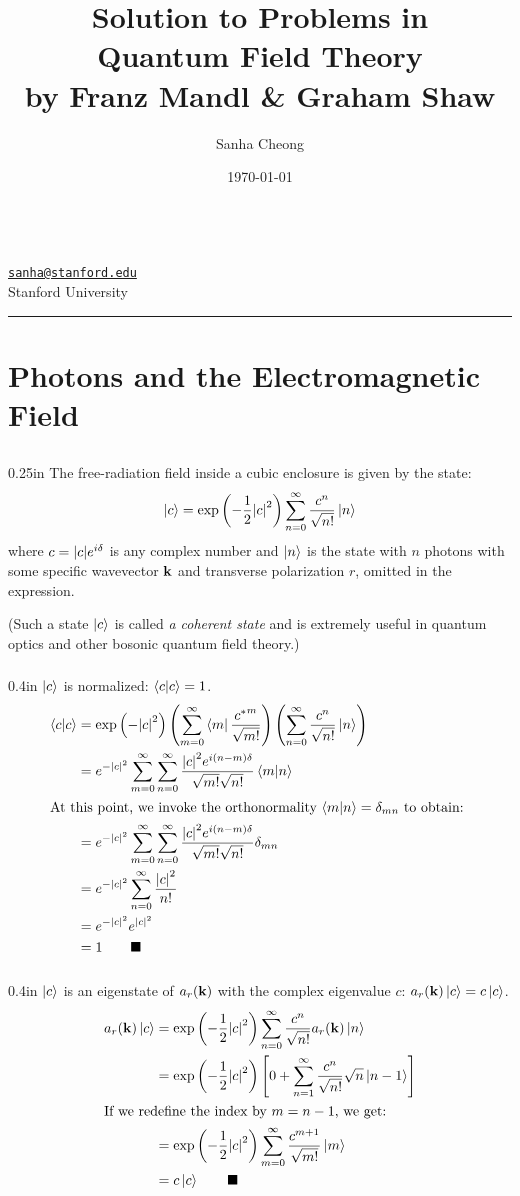 \documentclass[letterpaper,12pt]{article}
\title{
	\huge{Solution to Problems in\\Quantum Field Theory}\\
	\vspace{0.1in}
	\Large{by Franz Mandl \& Graham Shaw}
}
\author{Sanha Cheong}
\date{\today}
\makeatletter
\newcommand{\linia}{\rule{\linewidth}{0.5pt}}
\def\email{\texttt{\href{mailto:sanha@stanford.edu}{sanha@stanford.edu}}}
\def\institution{Stanford University}
\renewcommand{\maketitle}{
\begin{center}
\textsc{\@title}
\end{center}
\vspace{2ex}
\Large{\@author} \hfill \Large{\@date}		\\
\large{\email}	\hfill	$ $			\\
\large{\institution}
\\
\linia
}
\newenvironment{problem}{\subsection{}\begin{adjustwidth}{0.25in}{}\vspace{-\baselineskip}}{\end{adjustwidth}}
\newenvironment{subproblem}{\subsubsection{}\begin{adjustwidth}{0.4in}{}\vspace{-\baselineskip}}{\end{adjustwidth}}
\newcommand{\done}{\tag*{$\blacksquare$}}
\makeatother
\begin{document}
\maketitle

\section{Photons and the Electromagnetic Field}

\begin{problem}
The free-radiation field inside a cubic enclosure is given by the state:
\begin{equation*}
\ket{c} = \exp\left(-\frac{1}{2}\abs{c}^2\right)
\sum_{n=0}^{\infty} \frac{c^n}{\sqrt{n!}} \ket{n}
\end{equation*}
where $c=\abs{c}e^{i\delta}$ is any complex number and $\ket{n}$ is the state with $n$ photons with some specific wavevector $\vb{k}$ and transverse polarization $r$, omitted in the expression.

(Such a state $\ket{c}$ is called \emph{a coherent state} and is extremely useful in quantum optics and other bosonic quantum field theory.)

\begin{subproblem}
	$\ket{c}$ is normalized: $\braket{c}{c}=1$.
	\begin{align*}
		\braket{c}{c}
		&= \exp\left(-\abs{c}^2\right)
		\left(\sum_{m=0}^{\infty}\bra{m}\frac{{c^*}^m}{\sqrt{m!}}\right)
		\left(\sum_{n=0}^{\infty}\frac{c^n}{\sqrt{n!}}\ket{n}\right)	\\
		&= e^{-\abs{c}^2}
		\sum_{m=0}^{\infty}\sum_{n=0}^{\infty}
		\frac{\abs{c}^2 e^{i(n-m)\delta}}{\sqrt{m!}\sqrt{n!}}\braket{m}{n}	\\
	\intertext{At this point, we invoke the orthonormality $\braket{m}{n}=\delta_{mn}$ to obtain: }
		&= e^{-\abs{c}^2}
		\sum_{m=0}^{\infty}\sum_{n=0}^{\infty}
		\frac{\abs{c}^2 e^{i(n-m)\delta}}{\sqrt{m!}\sqrt{n!}} \delta_{mn}	\\
		&= e^{-\abs{c}^2} \sum_{n=0}^{\infty} \frac{\abs{c}^2}{n!}	\\
		&= e^{-\abs{c}^2} e^{\abs{c}^2}	\\
		&=1		\done
	\end{align*}
\end{subproblem}

\begin{subproblem}
	$\ket{c}$ is an eigenstate of $a_r(\vb{k})$ with the complex eigenvalue $c$: $a_r(\vb{k}) \ket{c} = c\ket{c}$.
	\begin{align*}
		a_r(\vb{k}) \ket{c} &=
		\exp\left(-\frac{1}{2}\abs{c}^2\right)
		\sum_{n=0}^{\infty} \frac{c^n}{\sqrt{n!}} a_r(\vb{k})\ket{n}	\\
		&= \exp\left(-\frac{1}{2}\abs{c}^2\right)
		\left[0 + \sum_{n=1}^{\infty} \frac{c^n}{\sqrt{n!}} \sqrt{n}\ket{n-1}\right]	\\
	\intertext{If we redefine the index by $m=n-1$, we get:}
		&= \exp\left(-\frac{1}{2}\abs{c}^2\right)
		\sum_{m=0}^{\infty} \frac{c^{m+1}}{\sqrt{m!}} \ket{m}	\\
		&= c\ket{c}		\done
	\end{align*}
\end{subproblem}


\end{problem}
\end{document}

